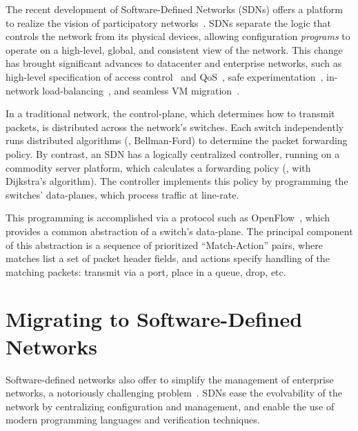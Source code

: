 The recent development of Software-Defined Networks (SDNs)
offers a platform to realize the vision of participatory networks~\cite{Greenberg:2005,McKeown:2008}.
SDNs separate
the logic that controls the network from its physical
devices, allowing configuration \emph{programs} to operate on a
high-level, global, and consistent view of the network. 
This change has brought significant advances to datacenter and
enterprise networks, such as high-level
specification of access control~\cite{Nayak:2009} and
QoS~\cite{Kim:2010}, safe experimentation~\cite{Sherwood:2010},
in-network load-balancing~\cite{wang11wild}, and seamless VM 
migration~\cite{Erickson:2008}.

In a traditional network, the control-plane, which determines how
to transmit packets, is distributed across the network's switches. Each
switch independently runs distributed algorithms (\eg, Bellman-Ford) to determine the
packet forwarding policy. By contrast, an SDN has a logically centralized
controller, running on a commodity server platform, which calculates
a forwarding policy (\eg, with Dijkstra's algorithm). The controller implements
this policy by programming the switches' data-planes, which process
traffic at line-rate.

This programming is accomplished via a protocol such as
OpenFlow~\cite{McKeown:2008}, which provides a common
abstraction of a switch's data-plane. The principal component of this
abstraction is a sequence of prioritized ``Match-Action'' pairs, where
matches list a set of packet header fields, and actions specify handling
of the matching packets: transmit via a port, place in a queue, drop, etc.

\section{Migrating to Software-Defined Networks}

Software-defined networks also offer to simplify the management
of enterprise networks, a notoriously challenging problem~\cite{
benson09unraveling,Casado07Ethane, casado06sane, kim11evolution,sung11systematic,
  yu11vpn}. 
SDNs ease the evolvability of the network by centralizing configuration
and management, and enable the use of modern programming
languages and verification techniques.

